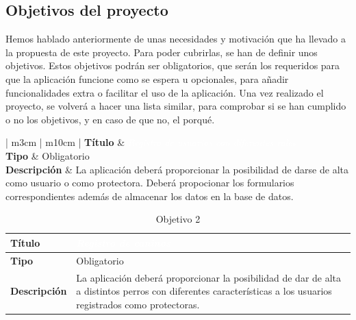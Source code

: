 \documentclass[a4paper, 12pt]{article}
\begin{document}
\newpage
\subsection{Objetivos del proyecto}

Hemos hablado anteriormente de unas necesidades y motivación que ha llevado a la propuesta de este proyecto. Para poder cubrirlas, se han de definir unos objetivos. Estos objetivos podrán ser obligatorios, que serán los requeridos para que la aplicación funcione como se espera u opcionales, para añadir funcionalidades extra o facilitar el uso de la aplicación. Una vez realizado el proyecto, se volverá a hacer una lista similar, para comprobar si se han cumplido o no los objetivos, y en caso de que no, el porqué.


\begin{table}[H]
	\captionsetup{width=0.95\linewidth}%
   	\captionsetup{singlelinecheck=false}%
	\captionsetup{font=bf}
	\caption{Objetivo 1}
	\begin{tabular}{ | m{3cm} | m{10cm} | }
		\hline {}\textbf{Título} &  \textcolor{white}{\textit{Registro de usuarios con diferentes roles}}  \\ \hline
		\textbf{Tipo} & Obligatorio \\ \hline
		\textbf{Descripción} & La aplicación deberá proporcionar la posibilidad de darse de alta como usuario o como protectora. Deberá propocionar los formularios correspondientes además de almacenar los datos en la base de datos.  \\ \hline
	\end{tabular}
\end{table} 

\begin{table}[H]
	\captionsetup{width=0.95\linewidth}%
   	\captionsetup{singlelinecheck=false}%
	\captionsetup{font=bf}
	\caption{Objetivo 2}
	\begin{tabular}{ | m{3cm} | m{10cm} | }
		\hline \cellcolor{lightgray}\textbf{Título} & \cellcolor{gray} \textcolor{white}{\textit{Registro de caninos}}  \\ \hline
		\cellcolor{lightgray}\textbf{Tipo} & Obligatorio \\ \hline
		\cellcolor{lightgray}\textbf{Descripción} & La aplicación deberá proporcionar la posibilidad de dar de alta a distintos perros con diferentes características a los usuarios registrados como protectoras.  \\ \hline
	\end{tabular}
\end{table} 
\end{document}
